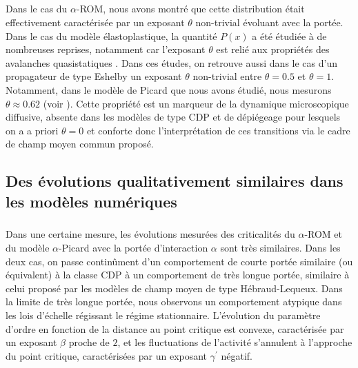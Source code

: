 \subparagraph{}Dans le cas du $\alpha$-ROM, nous avons montré que cette distribution était effectivement caractérisée par un exposant $\theta$ non-trivial évoluant avec la portée. Dans le cas du modèle élastoplastique, la quantité $P(x)$ a été étudiée à de nombreuses reprises, notamment car l'exposant $\theta$ est relié aux propriétés des avalanches quasistatiques \cite{lin_scaling_2014, ferrero_criticality_2019, liu_driving_2016, lin_mean_field_2016}. Dans ces études, on retrouve aussi dans le cas d'un propagateur de type Eshelby un exposant $\theta$ non-trivial entre $\theta = 0.5$ et $\theta = 1$. Notamment, dans le modèle de Picard que nous avons étudié, nous mesurons $\theta \approx 0.62$ (voir ). Cette propriété est un marqueur de la dynamique microscopique diffusive, absente dans les modèles de type CDP et de dépiégeage pour lesquels on a a priori $\theta = 0$ \cite{lin_scaling_2014} et conforte donc l'interprétation de ces transitions via le cadre de champ moyen commun proposé.

\subsection{Des évolutions qualitativement similaires dans les modèles numériques}

\subparagraph{}Dans une certaine mesure, les évolutions mesurées des criticalités du $\alpha$-ROM et du modèle $\alpha$-Picard avec la portée d'interaction $\alpha$ sont très similaires. Dans les deux cas, on passe continûment d'un comportement de courte portée similaire (ou équivalent) à la classe CDP à un comportement de très longue portée, similaire à celui proposé par les modèles de champ moyen de type Hébraud-Lequeux. Dans la limite de très longue portée, nous observons un comportement atypique dans les lois d'échelle régissant le régime stationnaire. L'évolution du paramètre d'ordre en fonction de la distance au point critique est convexe, caractérisée par un exposant $\beta$ proche de $2$, et les fluctuations de l'activité s'annulent à l'approche du point critique, caractérisées par un exposant $\gamma^\prime$ négatif.

